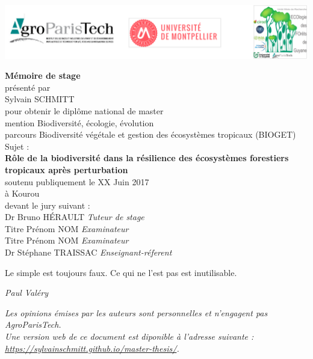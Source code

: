 \includegraphics{images/logos}

\begin{center}
  \LARGE{\textbf{Mémoire de stage}} \\
  \vspace*{\fill}
  \large{présenté par} \\
  \large{Sylvain SCHMITT} \\
  \vspace*{\fill}
  \large{pour obtenir le diplôme national de master} \\
  \large{mention Biodiversité, écologie, évolution} \\
  \small{parcours Biodiversité végétale et gestion des écosystèmes tropicaux (BIOGET)} \\
  \vspace*{\fill}
  \large{Sujet :} \\
  \Large{\textbf{Rôle de la biodiversité dans la résilience des écosystèmes forestiers tropicaux après perturbation}} \\
  \vspace*{\fill}
  \large{soutenu publiquement le XX Juin 2017} \\
  \large{à Kourou} \\
  \vspace*{\fill}
  \large{devant le jury suivant :} \\
  \vspace*{\fill}
  Dr Bruno HÉRAULT  \emph{Tuteur de stage} \\
  Titre Prénom NOM  \emph{Examinateur} \\
  Titre Prénom NOM  \emph{Examinateur} \\
  Dr Stéphane TRAISSAC  \emph{Enseignant-réferent} \\
\end{center}

\newpage
\vspace*{\fill}
\epigraph{Le simple est toujours faux. Ce qui ne l'est pas est inutilisable.}{\textit{Paul Valéry}}
\vspace*{\fill}
\emph{Les opinions émises par les auteurs sont personnelles et n'engagent pas AgroParisTech.}\\
\emph{Une version web de ce document est diponible à l'adresse suivante : \url{https://sylvainschmitt.github.io/master-thesis/}.}
\newpage
